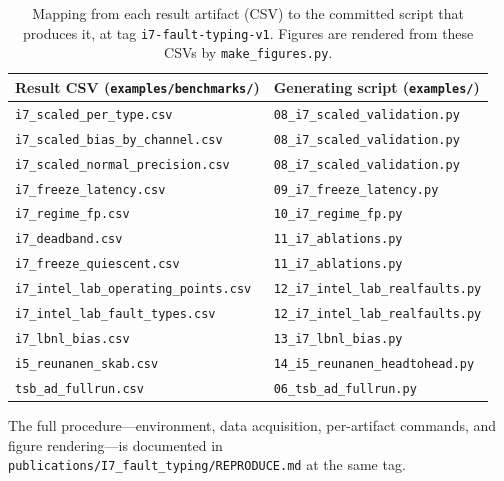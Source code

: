 \begin{table}[t]
    \centering
    \caption{Mapping from each result artifact (CSV) to the committed script that produces it, at tag \texttt{i7-fault-typing-v1}. Figures are rendered from these CSVs by \texttt{make\_figures.py}.}
    \label{tab:repro}
    \begin{tabular}{ll}
        \toprule
        Result CSV (\texttt{examples/benchmarks/}) & Generating script (\texttt{examples/}) \\
        \midrule
        \texttt{i7\_scaled\_per\_type.csv} & \texttt{08\_i7\_scaled\_validation.py} \\
        \texttt{i7\_scaled\_bias\_by\_channel.csv} & \texttt{08\_i7\_scaled\_validation.py} \\
        \texttt{i7\_scaled\_normal\_precision.csv} & \texttt{08\_i7\_scaled\_validation.py} \\
        \texttt{i7\_freeze\_latency.csv} & \texttt{09\_i7\_freeze\_latency.py} \\
        \texttt{i7\_regime\_fp.csv} & \texttt{10\_i7\_regime\_fp.py} \\
        \texttt{i7\_deadband.csv} & \texttt{11\_i7\_ablations.py} \\
        \texttt{i7\_freeze\_quiescent.csv} & \texttt{11\_i7\_ablations.py} \\
        \texttt{i7\_intel\_lab\_operating\_points.csv} & \texttt{12\_i7\_intel\_lab\_realfaults.py} \\
        \texttt{i7\_intel\_lab\_fault\_types.csv} & \texttt{12\_i7\_intel\_lab\_realfaults.py} \\
        \texttt{i7\_lbnl\_bias.csv} & \texttt{13\_i7\_lbnl\_bias.py} \\
        \texttt{i5\_reunanen\_skab.csv} & \texttt{14\_i5\_reunanen\_headtohead.py} \\
        \texttt{tsb\_ad\_fullrun.csv} & \texttt{06\_tsb\_ad\_fullrun.py} \\
        \bottomrule
    \end{tabular}
\end{table}

The full procedure---environment, data acquisition, per-artifact
commands, and figure rendering---is documented in
\texttt{publications/I7\_fault\_typing/REPRODUCE.md} at the same tag.
